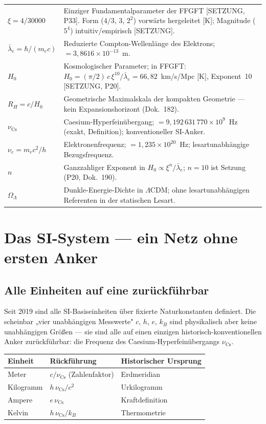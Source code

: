 \medskip
\begin{tabular}{@{}lp{10.5cm}}
$\xi = 4/30000$
  & Einziger Fundamentalparameter der FFGFT [SETZUNG, P33].
    Form ($4/3$, $3$, $2^2$) vorwärts hergeleitet [K];
    Magnitude ($5^4$) intuitiv/empirisch [SETZUNG]. \\[4pt]
$\bar\lambda_e = \hbar/(m_e c)$
  & Reduzierte Compton-Wellenlänge des Elektrons;
    $= 3{,}8616\times10^{-13}$~m. \\[4pt]
$H_0$
  & Kosmologischer Parameter; in FFGFT:
    $H_0 = (\pi/2)\,c\,\xi^{10}/\bar\lambda_e = 66{,}82$~km/s/Mpc
    [K], Exponent~10 [SETZUNG, P20]. \\[4pt]
$R_H = c/H_0$
  & Geometrische Maximalskala der kompakten Geometrie —
    kein Expansionshorizont (Dok.~182). \\[4pt]
$\nu_\text{Cs}$
  & Caesium-Hyperfeinübergang; $= 9{,}192\,631\,770\times10^9$~Hz
    (exakt, Definition); konventioneller SI-Anker. \\[4pt]
$\nu_e = m_e c^2/h$
  & Elektronenfrequenz; $= 1{,}235\times10^{20}$~Hz;
    lesartunabhängige Bezugsfrequenz. \\[4pt]
$n$
  & Ganzzahliger Exponent in $H_0 \propto \xi^n/\bar\lambda_e$;
    $n = 10$ ist Setzung (P20, Dok.~190). \\[4pt]
$\Omega_\Lambda$
  & Dunkle-Energie-Dichte in $\Lambda$CDM;
    ohne lesartunabhängigen Referenten in der statischen Lesart. \\
\end{tabular}

\chapter{Das SI-System — ein Netz ohne ersten Anker}

\section{Alle Einheiten auf eine zurückführbar}

Seit 2019 sind alle SI-Basiseinheiten über fixierte Naturkonstanten
definiert. Die scheinbar „vier unabhängigen Messwerte" $c$, $h$, $e$,
$k_B$ sind physikalisch aber keine unabhängigen Größen — sie sind alle
auf einen einzigen historisch-konventionellen Anker zurückführbar:
die Frequenz des Caesium-Hyperfeinübergangs $\nu_\text{Cs}$.

\begin{center}
\begin{tabular}{lll}
\toprule
Einheit & Rückführung & Historischer Ursprung \\
\midrule
Meter   & $c/\nu_\text{Cs}$ (Zahlenfaktor) & Erdmeridian \\
Kilogramm & $h\,\nu_\text{Cs}/c^2$ & Urkilogramm \\
Ampere  & $e\,\nu_\text{Cs}$ & Kraftdefinition \\
Kelvin  & $h\,\nu_\text{Cs}/k_B$ & Thermometrie \\
\bottomrule
\end{tabular}
\end{center}

